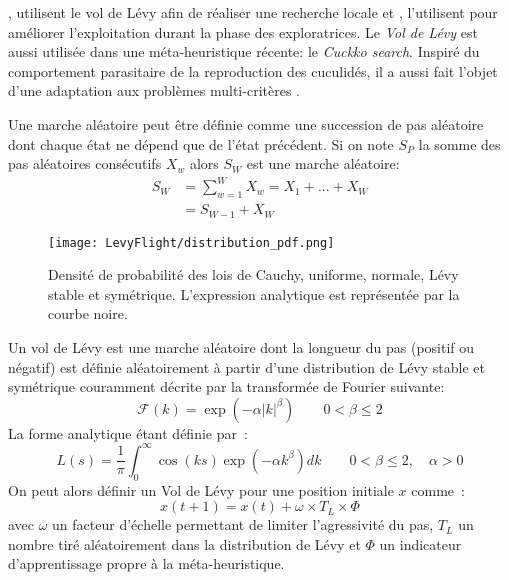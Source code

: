 \cite{Sharma2012213}, utilisent le vol de Lévy afin de réaliser une recherche
locale et \cite{Hakli2013254}, l’utilisent pour améliorer l’exploitation durant la phase des
exploratrices. Le \textit{Vol de Lévy} est aussi utilisée dans une méta-heuristique récente: le
\textit{Cuckko search}. Inspiré du comportement parasitaire de la reproduction des cuculidés, il a
aussi fait l’objet d’une adaptation aux problèmes multi-critères \parencite{Yang20131616}.

\begin{Def}\label{def:marche_aleatoire}
Une marche aléatoire \parencite{Yang201445} peut être définie comme une succession de pas
aléatoire dont chaque état ne dépend que de l’état précédent. Si on note $S_{P}$
la somme des pas aléatoires consécutifs $X_{w}$ alors $S_{W}$ est une marche aléatoire:
\begin{equation}\label{eq:marche_aleatoire}
    \begin{split}
        S_{W} &= \sum_{w=1}^{W} X_{w} = X_{1} + ... + X_{W}\\
              &= S_{W-1} + X_{W}
    \end{split}
\end{equation}
\end{Def}

\begin{figure}
    \begin{center}
        \texttt{[image: LevyFlight/distribution\_pdf.png]}
    \end{center}
    \caption{Densité de probabilité des lois de Cauchy, uniforme, normale, Lévy stable et symétrique.
             L’expression analytique est représentée par la courbe noire.
             \label{fig:distribution_pdf}}
\end{figure}

\begin{Def}\label{def:vol_levy}
Un vol de Lévy est une marche aléatoire dont la longueur du pas (positif ou négatif)
est définie aléatoirement à partir d’une distribution de Lévy stable et symétrique
couramment décrite par la transformée de Fourier suivante:
\begin{equation}\label{eq:fourier_levy}
    \mathcal{F}(k) = \exp(-\alpha\mathopen{|}k\mathclose{|}^{\beta}) \qquad  0 < \beta \leq 2
\end{equation}
La forme analytique étant définie par~:
\begin{equation}\label{eq:dist_levy}
    L(s) = \frac{1}{\pi} \int_{0}^{\infty} \cos(k s)\exp(-\alpha k^{\beta}) dk \qquad  0 < \beta \leq 2,
           \quad \alpha > 0
\end{equation}
On peut alors définir un Vol de Lévy pour une position initiale $x$ comme~:
\begin{equation}
  x(t + 1) = x(t) + \omega \times T_{L} \times \Phi
\end{equation}
avec $\omega$ un facteur d’échelle permettant de limiter l’agressivité du pas,
$T_{L}$ un nombre tiré aléatoirement dans la distribution de Lévy et $\Phi$
un indicateur d’apprentissage propre à la méta-heuristique.
\end{Def}

